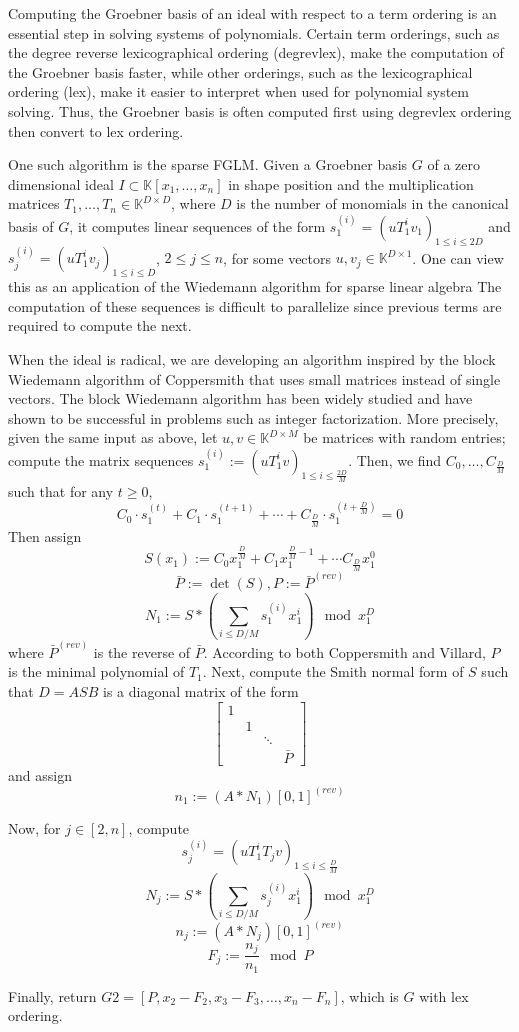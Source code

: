 \documentclass[12pt]{article}
\begin{document}
Computing the Groebner basis of an ideal with respect to a term ordering 
is an essential step in solving systems of polynomials.
Certain term orderings, such as the degree reverse lexicographical ordering (degrevlex),
make the computation of the Groebner basis faster, while other orderings, 
such as the lexicographical ordering (lex), make it easier to interpret when
used for polynomial system solving. Thus, the Groebner basis is often computed
first using degrevlex ordering then convert to lex ordering.

One such algorithm is the sparse FGLM. Given a Groebner basis $G$ of a zero 
dimensional ideal $I \subset \mathbb{K}[x_1, \dots, x_n]$ 
in shape position and the multiplication matrices $T_1,\dots, T_n \in \mathbb{K}^{D \times D}$,
where $D$ is the number of monomials in the canonical basis of $G$, it computes 
linear sequences of the form $s_1^{(i)} = (uT_1^iv_1)_{1\le i \le 2D}$ and
$s_j^{(i)} = (uT_1^iv_j)_{1\le i \le D}$, $2 \le j \le n$, for some vectors $u,v_j \in 
\mathbb{K}^{D\times 1}$. One can view this as an application of the Wiedemann algorithm 
for sparse linear algebra The computation of these sequences is difficult to parallelize 
since previous terms are required to compute the next. 

When the ideal is radical, we are developing an algorithm inspired by the block Wiedemann algorithm of Coppersmith
that uses small matrices instead of single vectors. The block Wiedemann algorithm has been 
widely studied and have shown to be successful in problems such as integer factorization.
More precisely, given the same input as above, let $u,v \in \mathbb{K}^{D \times M}$ be 
matrices with random entries; compute the matrix sequences $s_1^{(i)} := (uT_1^iv)_{1\le i \le \frac{2D}{M}}$. 
Then, we find $C_0, \dots, C_\frac{D}{M}$ such that for any $t \ge 0$,
$$ C_0 \cdot s_1^{(t)} + C_1 \cdot s_1^{(t+1)} + \cdots + C_{\frac{D}{M}} \cdot s_1^{(t+\frac{D}{M})}  = 0$$
Then assign
$$ S(x_1) := C_0  x_1^{\frac{D}{M}} + C_1  x_1^{\frac{D}{M} - 1} + \cdots C_{\frac{D}{M}} x_1^0$$
$$ \bar{P} := \det(S) , P := \bar{P}^{(rev)}$$
$$ N_1 := S * (\sum_{i\le D/M} s_1^{(i)} x_1^i) \mod x_1^D$$
where $\bar{P}^{(rev)}$ is the reverse of $\bar{P}$. According to both Coppersmith and Villard,
$P$ is the minimal polynomial of $T_1$. Next, compute the Smith normal form 
of $S$ such that $D = A S B$ is a diagonal matrix of the form
$$\begin{bmatrix}
	1 &  &        & \\
	  & 1&        &  \\ 
	  &  & \ddots & \\
	  &  &        & \bar{P}
\end{bmatrix}$$
and assign
$$ n_1 := (A*N_1)[0,1]^{(rev)}$$

Now, for $j \in [2,n]$, compute 
$$s_j^{(i)} = (uT_1^i T_j v)_{1\le i \le \frac{D}{M}}$$
$$N_j := S*(\sum_{i\le D/M} s_j^{(i)} x_1^i) \mod x_1^D$$
$$n_j := (A*N_j)[0,1]^{(rev)}$$
$$F_j := \frac{n_j}{n_1} \mod P$$

Finally, return $G2 = [P, x_2 - F_2, x_3 - F_3, \dots, x_n - F_n]$, which is $G$ with lex ordering.
\end{document}
